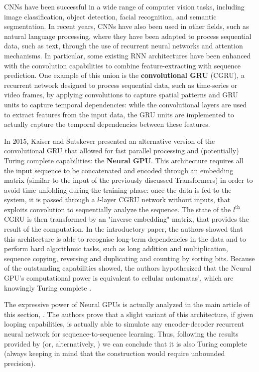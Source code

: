 \documentclass{article}
\begin{document}
CNNs have been successful in a wide range of computer vision tasks, including image classification, object detection, facial recognition, and semantic segmentation. In recent years, CNNs have also been used in other fields, such as natural language processing, where they have been adapted to process sequential data, such as text, through the use of recurrent neural networks and attention mechanisms. In particular, some existing RNN architectures have been enhanced with the convolution capabilities to combine feature-extracting with sequence prediction. One example of this union is the \textbf{convolutional GRU} (CGRU), a recurrent network designed to process sequential data, such as time-series or video frames, by applying convolutions to capture spatial patterns and GRU units to capture temporal dependencies: while the convolutional layers are used to extract features from the input data, the GRU units are implemented to actually capture the temporal dependencies between these features.

In 2015, Kaiser and Sutskever \cite{KAI15} presented an alternative version of the convolutional GRU that allowed for fast parallel processing and (potentially) Turing complete capabilities: the \textbf{Neural GPU}. This architecture requires all the input sequence to be concatenated and encoded through an embedding matrix (similar to the input of the previously discussed Transformers) in order to avoid time-unfolding during the training phase: once the data is fed to the system, it is passed through a $l$-layer CGRU network without inputs, that exploits convolution to sequentially analyze the sequence. The state of the $l^{\textrm{th}}$ CGRU is then transformed by an "inverse embedding" matrix, that provides the result of the computation. In the introductory paper, the authors showed that this architecture is able to recognise long-term dependencies in the data and to perform hard algorithmic tasks, such as long addition and multiplication, sequence copying, reversing and duplicating and counting by sorting bits. Because of the outstanding capabilities showed, the authors hypothesized that the Neural GPU's computational power is equivalent to cellular automatas', which are knowingly Turing complete \cite{COO04}.

The expressive power of Neural GPUs is actually analyzed in the main article of this section, \cite{PER19}. The authors prove that a slight variant of this architecture, if given looping capabilities, is actually able to simulate any encoder-decoder recurrent neural network for sequence-to-sequence learning. Thus, following the results provided by \cite{SIE95} (or, alternatively, \cite{CHU21}) we can conclude that it is also Turing complete (always keeping in mind that the construction would require unbounded precision).
\end{document}
